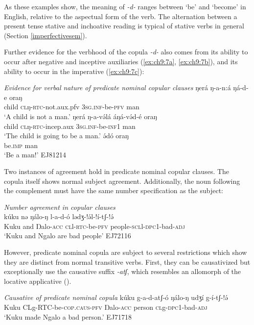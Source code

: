 As these examples show, the meaning of \textit{-d-} ranges between `be' and `become' in English, relative to the aspectual form of the verb. The alternation between a present tense stative and inchoative reading is typical of stative verbs in general (Section \ref{imperfectivesem}). 

Further evidence for the verbhood of the copula \textit{-d-} also comes from its ability to occur after negative and inceptive auxiliaries (\ref{ex:ch9:7a}, \ref{ex:ch9:7b}), and its ability to occur in the imperative (\ref{ex:ch9:7c}):

\ea \textit{Evidence for verbal nature of predicate nominal copular clauses}
	\ea  	\gll  	ŋerá		ŋ-a-n:á					ŋá-d-e		oraŋ	\\
					child		\textsc{cl}ŋ-\textsc{rtc}-not.aux.pfv		\textsc{3sg.inf}-be-\textsc{pfv}	man \\
			\glt  	‘A child is not a man.’		\label{ex:ch9:7a}				
	\ex 	\gll 	ŋerá		ŋ-a-və́lá			áŋá-və́d-é		oraŋ	\\
	 				child		\textsc{cl}ŋ-\textsc{rtc}-incep.aux	\textsc{3sg.inf}-be-\textsc{inf}1	man\\
		 	\glt	‘The child is going to be a man.’		\label{ex:ch9:7b}	
	\ex 	\gll 	ə́dó 		oraŋ		    			\\
					be.\textsc{imp}		man\\
			\glt	‘Be a man!’				\hfill 					EJ81214 \label{ex:ch9:7c}
	\z \z 
	
Two instances of agreement hold in predicate nominal copular clauses. The copula itself shows normal subject agreement. Additionally, the noun following the complement must have the same number specification as the subject:

\ea  \textit{Number agreement in copular clauses}\\
\gll kúku nə ŋálo-ŋ l-a-d-ó lədʒ-!ə́l-!í-tʃ-!ə́\\
		Kuku and Ŋalo-\textsc{acc} \textsc{cl}l-\textsc{rtc}-be-\textsc{pfv} people-\textsc{scl}l-\textsc{dpc}1-bad-\textsc{adj}\\
	\glt 		`Kuku and Ngalo are bad people' \hfill EJ72116 \z 

However, predicate nominal copula are subject to several restrictions which show they are distinct from normal transitive verbs. First, they can be causativized but exceptionally use the causative suffix \textit{-atʃ}, which resembles an allomorph of the locative applicative ().

\ea \textit{Causative of predicate nominal copula} \label{ex:ch9:copcaus}
\gll	kúku 	g-a-d-atʃ-ó	ŋálo-ŋ 	udʒí    g-í-tʃ-!ə́\\
	Kuku 	\textsc{CL}g-\textsc{RTC}-be-\textsc{cop.caus-pfv}	Ŋalo-\textsc{acc} person \textsc{cl}g-\textsc{dpc1}-bad-\textsc{adj}\\
\glt 	`Kuku made Ngalo a bad person.' \hfill EJ71718
\z 

